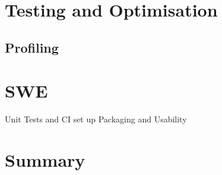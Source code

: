 \documentclass[11pt]{article}
\begin{document}
\section {Testing and Optimisation}
\subsection {Profiling}

\section {SWE}
Unit Tests and CI set up
Packaging and Usability

\section {Summary}




\end{document}
